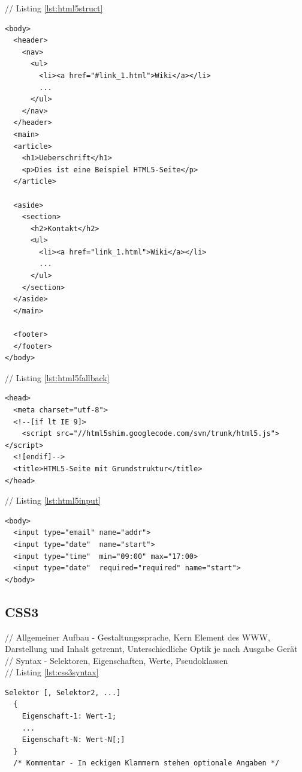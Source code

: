 \documentclass[12pt,a4paper,bibliography=totocnumbered,listof=totocnumbered]{scrartcl}
\begin{document}
// Listing \ref{lst:html5struct}	
    \vspace{1em}
	\begin{lstlisting}[caption=HTML5 Struktur Elemente, label=lst:html5struct]
<body>
  <header>
    <nav>
      <ul>
        <li><a href="#link_1.html">Wiki</a></li>
        ...
      </ul>
    </nav>
  </header>
  <main>
  <article>
    <h1>Ueberschrift</h1>
    <p>Dies ist eine Beispiel HTML5-Seite</p>
  </article>

  <aside>
    <section>
      <h2>Kontakt</h2>
      <ul>
        <li><a href="link_1.html">Wiki</a></li>
        ...
      </ul>
    </section>
  </aside>
  </main>

  <footer>
  </footer>
</body>
	\end{lstlisting}
	
// Listing \ref{lst:html5fallback}	
    \vspace{1em}
	\begin{lstlisting}[caption=HTML5 Internet Explorer Fallback, label=lst:html5fallback]
<head>
  <meta charset="utf-8">
  <!--[if lt IE 9]>
    <script src="//html5shim.googlecode.com/svn/trunk/html5.js"></script>
  <![endif]-->
  <title>HTML5-Seite mit Grundstruktur</title>
</head>
	\end{lstlisting}
	
	// Listing \ref{lst:html5input}	
    \vspace{1em}
	\begin{lstlisting}[caption=HTML5 Formular Eingabe, label=lst:html5input]
<body>
  <input type="email" name="addr"> 
  <input type="date"  name="start">
  <input type="time"  min="09:00" max="17:00>
  <input type="date"  required="required" name="start">
</body>
	\end{lstlisting}
	
\subsection{CSS3}
// Allgemeiner Aufbau - Gestaltungssprache, Kern Element des WWW, Darstellung und Inhalt getrennt, Unterschiedliche Optik je nach Ausgabe Gerät\\
// Syntax - Selektoren, Eigenschaften, Werte, Pseudoklassen\\
// Listing \ref{lst:css3syntax}
	\vspace{1em}
	\begin{lstlisting}[caption=CSS3 Syntax Beispiel, label=lst:css3syntax]
Selektor [, Selektor2, ...]
  {
    Eigenschaft-1: Wert-1;
    ...
    Eigenschaft-N: Wert-N[;]
  }
  /* Kommentar - In eckigen Klammern stehen optionale Angaben */
	\end{lstlisting}
\end{document}
